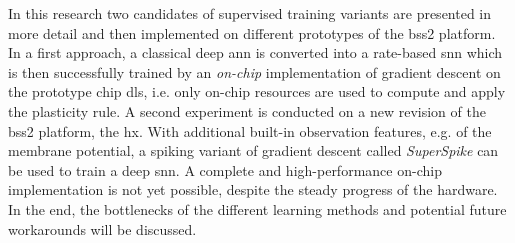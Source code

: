 In this research two candidates of supervised training variants are presented in more detail and then implemented on different prototypes of the \gls{bss2} platform. In a first approach, a classical deep \gls{ann} is converted into a rate-based \gls{snn} which is then successfully trained by an \textit{on-chip} implementation of gradient descent on the prototype chip \acrshort{dls}, i.e. only on-chip resources are used to compute and apply the plasticity rule. A second experiment is conducted on a new revision of the \gls{bss2} platform, the \acrshort{hx}. With additional built-in observation features, e.g. of the membrane potential, a spiking variant of gradient descent called \emph{SuperSpike} can be used to train a deep \gls{snn}. A complete and high-performance on-chip implementation is not yet possible, despite the steady progress of the hardware. In the end, the bottlenecks of the different learning methods and potential future workarounds will be discussed.\\